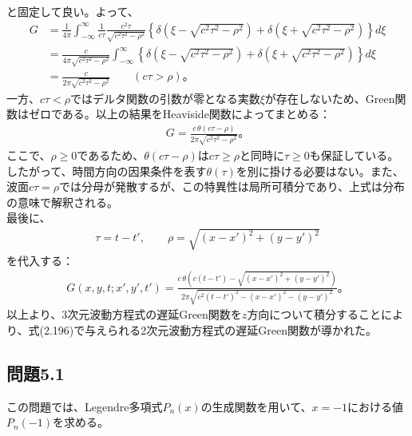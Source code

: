 \documentclass[platex,dvipdfmx,a4paper]{jsarticle}
\begin{document}
  と固定して良い。よって、
  \begin{align*}
    G
    &=
    \frac{1}{4\pi}
    \int_{-\infty}^{\infty}
    \frac{1}{c\tau}
    \frac{c^2\tau}{\sqrt{c^2\tau^2-\rho^2}}
    \left\{
      \delta\left(\xi-\sqrt{c^2\tau^2-\rho^2}\right)
      +
      \delta\left(\xi+\sqrt{c^2\tau^2-\rho^2}\right)
    \right\}d\xi\\
    &=
    \frac{c}{4\pi\sqrt{c^2\tau^2-\rho^2}}
    \int_{-\infty}^{\infty}
    \left\{
      \delta\left(\xi-\sqrt{c^2\tau^2-\rho^2}\right)
      +
      \delta\left(\xi+\sqrt{c^2\tau^2-\rho^2}\right)
    \right\}d\xi\\
    &=
    \frac{c}{2\pi\sqrt{c^2\tau^2-\rho^2}}
    \qquad(c\tau>\rho)。
  \end{align*}
  一方、$c\tau<\rho$ではデルタ関数の引数が零となる実数$\xi$が存在しないため、Green関数はゼロである。以上の結果をHeaviside関数によってまとめる：
  \begin{align*}
    G
    =
    \frac{c\,\theta(c\tau-\rho)}
    {2\pi\sqrt{c^2\tau^2-\rho^2}}。
  \end{align*}
  ここで、$\rho\geq0$であるため、$\theta(c\tau-\rho)$は$c\tau\geq\rho$と同時に$\tau\geq0$も保証している。したがって、時間方向の因果条件を表す$\theta(\tau)$を別に掛ける必要はない。また、波面$c\tau=\rho$では分母が発散するが、この特異性は局所可積分であり、上式は分布の意味で解釈される。\\
  最後に、
  \begin{align*}
    \tau=t-t',
    \qquad
    \rho=\sqrt{(x-x')^2+(y-y')^2}
  \end{align*}
  を代入する：
  \begin{align*}
    G(x,y,t;x',y',t')
    =
    \frac{c\,\theta\left(c(t-t')-\sqrt{(x-x')^2+(y-y')^2}\right)}
    {2\pi\sqrt{c^2(t-t')^2-(x-x')^2-(y-y')^2}}。
  \end{align*}
  以上より、3次元波動方程式の遅延Green関数を$z$方向について積分することにより、式(2.196)で与えられる2次元波動方程式の遅延Green関数が導かれた。

  \subsection*{問題5.1}

  この問題では、Legendre多項式$P_n(x)$の生成関数を用いて、$x=-1$における値$P_n(-1)$を求める。
  
\end{document}
